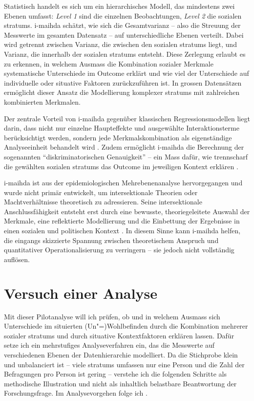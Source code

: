 Statistisch handelt es sich um ein hierarchisches Modell, das mindestens zwei Ebenen umfasst: \textit{Level 1} sind die einzelnen Beobachtungen, \textit{Level 2} die sozialen \glspl{stratum}. \gls{i-maihda} schätzt, wie sich die Gesamtvarianz -- also die Streuung der Messwerte im gesamten Datensatz -- auf unterschiedliche Ebenen verteilt. Dabei wird getrennt zwischen Varianz, die zwischen den sozialen \glspl{stratum} liegt, und Varianz, die innerhalb der sozialen \glspl{stratum} entsteht. Diese Zerlegung erlaubt es zu erkennen, in welchem Ausmass die Kombination sozialer Merkmale systematische Unterschiede im Outcome erklärt und wie viel der Unterschiede auf individuelle oder situative Faktoren zurückzuführen ist. In grossen Datensätzen ermöglicht dieser Ansatz die Modellierung komplexer \glspl{stratum} mit zahlreichen kombinierten Merkmalen.

Der zentrale Vorteil von \gls{i-maihda} gegenüber klassischen Regressionsmodellen liegt darin, dass nicht nur einzelne Haupteffekte und ausgewählte Interaktionsterme berücksichtigt werden, sondern jede Merkmalskombination als eigenständige Analyseeinheit behandelt wird \parencite{scottIntersectionalityQuantitativeMethods2017,bowlegInvitedReflectionQuantifying2016}. Zudem ermöglicht \gls{i-maihda} die Berechnung der sogenannten \enquote{diskriminatorischen Genauigkeit} -- ein Mass dafür, wie trennscharf die gewählten sozialen \glspl{stratum} das Outcome im jeweiligen Kontext erklären \parencite{evansTutorialConductingIntersectional2024}.

\gls{i-maihda} ist aus der epidemiologischen Mehrebenenanalyse hervorgegangen und wurde nicht primär entwickelt, um intersektionale Theorien oder Machtverhältnisse theoretisch zu adressieren. Seine intersektionale Anschlussfähigkeit entsteht erst durch eine bewusste, theoriegeleitete Auswahl der Merkmale, eine reflektierte Modellierung und die Einbettung der Ergebnisse in einen sozialen und politischen Kontext \parencite{grossModellingIntersectionalityQuantitative2023}. In diesem Sinne kann \gls{i-maihda} helfen, die eingangs skizzierte Spannung zwischen theoretischem Anspruch und quantitativer Operationalisierung zu verringern -- sie jedoch nicht vollständig auflösen.

\section{Versuch einer Analyse}

Mit dieser Pilotanalyse will ich prüfen, ob und in welchem Ausmass sich Unterschiede im situierten (Un\nobreakdash"=)Wohlbefinden durch die Kombination mehrerer sozialer \glspl{stratum} und durch situative Kontextfaktoren erklären lassen. Dafür setze ich ein mehrstufiges Analyseverfahren ein, das die Messwerte auf verschiedenen Ebenen der Datenhierarchie modelliert. Da die Stichprobe klein und unbalanciert ist -- viele \glspl{stratum} umfassen nur eine Person und die Zahl der Befragungen pro Person ist gering -- verstehe ich die folgenden Schritte als methodische Illustration und nicht als inhaltlich belastbare Beantwortung der Forschungsfrage. Im Analysevorgehen folge ich \textcite{evansTutorialConductingIntersectional2024}.

